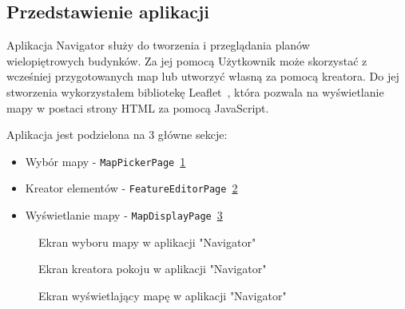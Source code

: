 \subsection{Przedstawienie aplikacji}

Aplikacja Navigator służy do tworzenia i przeglądania planów\\%
wielopiętrowych budynków.
Za jej pomocą Użytkownik może skorzystać z wcześniej przygotowanych map lub utworzyć własną za pomocą kreatora.
Do jej stworzenia wykorzystałem bibliotekę Leaflet~\cite{leafletGithub}, 
która pozwala na wyświetlanie mapy w postaci strony HTML za pomocą JavaScript.

Aplikacja jest podzielona na 3 główne sekcje: 
\begin{itemize}
    \item Wybór mapy - \verb|MapPickerPage|~\ref{img:MapPickerPage}
    \item Kreator elementów - \verb|FeatureEditorPage|~\ref{img:FeatureEditorPage}
    \item Wyświetlanie mapy - \verb|MapDisplayPage|~\ref{img:MapDisplayPage}
\end{itemize}

\begin{figure}[h]
    \centering
    \caption{Ekran wyboru mapy w aplikacji "Navigator"}
    \label{img:MapPickerPage}
\end{figure}

\begin{figure}[ht]
    \centering
    \caption{Ekran kreatora pokoju w aplikacji "Navigator"}
    \label{img:FeatureEditorPage}
\end{figure}


\begin{figure}[H]
    \centering
    \caption{Ekran wyświetlający mapę w aplikacji "Navigator"}
    \label{img:MapDisplayPage}
\end{figure}
